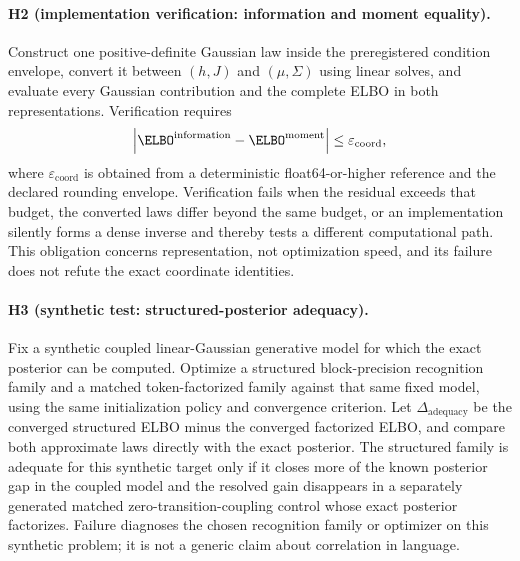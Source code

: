 \paragraph{H2 (implementation verification: information and moment equality).}
Construct one positive-definite Gaussian law inside the preregistered condition envelope, convert it between $(h,J)$ and $(\mu,\Sigma)$ using linear solves, and evaluate every Gaussian contribution and the complete ELBO in both representations. Verification requires
\begin{equation}
\left|
\ELBO^{\mathrm{information}}
-\ELBO^{\mathrm{moment}}
\right|
\leq\varepsilon_{\mathrm{coord}},
\label{eq:h2-coordinate-equality-threshold}
\end{equation}
where $\varepsilon_{\mathrm{coord}}$ is obtained from a deterministic float64-or-higher reference and the declared rounding envelope. Verification fails when the residual exceeds that budget, the converted laws differ beyond the same budget, or an implementation silently forms a dense inverse and thereby tests a different computational path. This obligation concerns representation, not optimization speed, and its failure does not refute the exact coordinate identities.

\paragraph{H3 (synthetic test: structured-posterior adequacy).}
Fix a synthetic coupled linear-Gaussian generative model for which the exact posterior can be computed. Optimize a structured block-precision recognition family and a matched token-factorized family against that same fixed model, using the same initialization policy and convergence criterion. Let $\Delta_{\mathrm{adequacy}}$ be the converged structured ELBO minus the converged factorized ELBO, and compare both approximate laws directly with the exact posterior. The structured family is adequate for this synthetic target only if it closes more of the known posterior gap in the coupled model and the resolved gain disappears in a separately generated matched zero-transition-coupling control whose exact posterior factorizes. Failure diagnoses the chosen recognition family or optimizer on this synthetic problem; it is not a generic claim about correlation in language.

